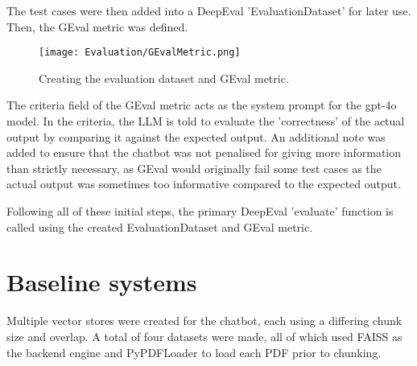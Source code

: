 \para The test cases were then added into a DeepEval 'EvaluationDataset' for later use. Then, the GEval metric was defined.

\begin{figure}[H]
    \centering
    \texttt{[image: Evaluation/GEvalMetric.png]}
    \caption{Creating the evaluation dataset and GEval metric. \label{fig:GEvalAndDataset}}
\end{figure}

\noindent The criteria field of the GEval metric acts as the system prompt for the gpt-4o model. In the criteria, the LLM is told 
to evaluate the 'correctness' of the actual output by comparing it against the expected output. An additional note was added to ensure 
that the chatbot was not penalised for giving more information than strictly necessary, as GEval would originally fail some test cases 
as the actual output was sometimes too informative compared to the expected output.

\para Following all of these initial steps, the primary DeepEval 'evaluate' function is called using the created EvaluationDataset
and GEval metric. 

\section{Baseline systems}
Multiple vector stores were created for the chatbot, each using a differing chunk size and overlap. A total of four datasets were 
made, all of which used FAISS as the backend engine and PyPDFLoader to load each PDF prior to chunking. 

